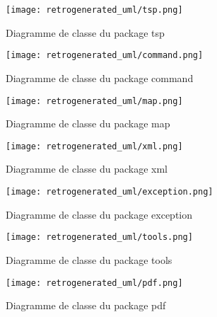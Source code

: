 \begin{figure}[h!]
    		\begin{center}
      			\texttt{[image: retrogenerated\_uml/tsp.png]}
      			\caption{Diagramme de classe du package tsp}
    		\end{center}
  	\end{figure}
\begin{figure}[h!]
    		\begin{center}
      			\texttt{[image: retrogenerated\_uml/command.png]}
      			\caption{Diagramme de classe du package command}
    		\end{center}
  	\end{figure}
\begin{figure}[h!]
    		\begin{center}
      			\texttt{[image: retrogenerated\_uml/map.png]}
      			\caption{Diagramme de classe du package map}
    		\end{center}
  	\end{figure}
\begin{figure}[h!]
    		\begin{center}
      			\texttt{[image: retrogenerated\_uml/xml.png]}
      			\caption{Diagramme de classe du package xml}
    		\end{center}
  	\end{figure}
\begin{figure}[h!]
    		\begin{center}
      			\texttt{[image: retrogenerated\_uml/exception.png]}
      			\caption{Diagramme de classe du package exception}
    		\end{center}
  	\end{figure}
\begin{figure}[h!]
    		\begin{center}
      			\texttt{[image: retrogenerated\_uml/tools.png]}
      			\caption{Diagramme de classe du package tools}
    		\end{center}
  	\end{figure}
\begin{figure}[h!]
    		\begin{center}
      			\texttt{[image: retrogenerated\_uml/pdf.png]}
      			\caption{Diagramme de classe du package pdf}
    		\end{center}
  	\end{figure}
